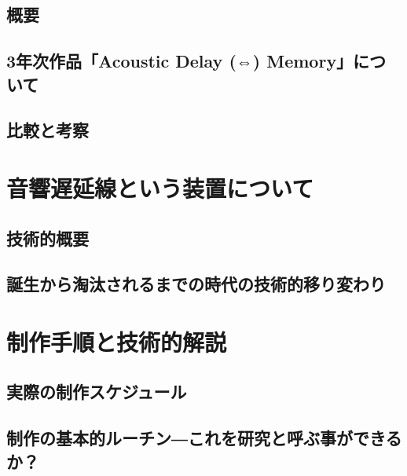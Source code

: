 \section{概要}\label{ux6982ux8981}

\section{3年次作品「Acoustic Delay (⇔)
Memory」について}\label{ux5e74ux6b21ux4f5cux54c1acoustic-delay-memoryux306bux3064ux3044ux3066}

\section{比較と考察}\label{ux6bd4ux8f03ux3068ux8003ux5bdf}

\chapter{音響遅延線という装置について}\label{ux97f3ux97ffux9045ux5ef6ux7ddaux3068ux3044ux3046ux88c5ux7f6eux306bux3064ux3044ux3066}

\section{技術的概要}\label{ux6280ux8853ux7684ux6982ux8981}

\section{誕生から淘汰されるまでの時代の技術的移り変わり}\label{ux8a95ux751fux304bux3089ux6dd8ux6c70ux3055ux308cux308bux307eux3067ux306eux6642ux4ee3ux306eux6280ux8853ux7684ux79fbux308aux5909ux308fux308a}

\chapter{制作手順と技術的解説}\label{ux5236ux4f5cux624bux9806ux3068ux6280ux8853ux7684ux89e3ux8aac}

\section{実際の制作スケジュール}\label{ux5b9fux969bux306eux5236ux4f5cux30b9ux30b1ux30b8ux30e5ux30fcux30eb}

\section{制作の基本的ルーチン―これを研究と呼ぶ事ができるか？}\label{ux5236ux4f5cux306eux57faux672cux7684ux30ebux30fcux30c1ux30f3ux3053ux308cux3092ux7814ux7a76ux3068ux547cux3076ux4e8bux304cux3067ux304dux308bux304b}

